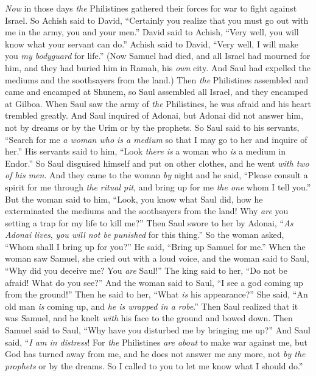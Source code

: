 \begin{biblechapter} %
\verse \textit{Now} in those days \textit{the} Philistines gathered their forces for war to fight against Israel. So Achish said to David, “Certainly you realize that you must go out with me in the army, you and your men.”
\verse David said to Achish, “Very well, you will know what your servant can do.” Achish said to David, “Very well, I will make you \textit{my bodyguard} for life.”
 (Now Samuel had died, and all Israel had mourned for him, and they had buried him in Ramah, his \textit{own} city. And Saul had expelled the mediums and the soothsayers from the land.)
\verse Then \textit{the} Philistines assembled and came and encamped at Shunem, so Saul assembled all Israel, and they encamped at Gilboa.
\verse When Saul saw the army of \textit{the} Philistines, he was afraid and his heart trembled greatly.
\verse And Saul inquired of Adonai, but Adonai did not answer him, not by dreams or by the Urim or by the prophets.
\verse So Saul said to his servants, “Search for me \textit{a woman who is a medium} so that I may go to her and inquire of her.” His servants said to him, “Look \textit{there is} a woman who \textit{is} a medium in Endor.”
\verse So Saul disguised himself and put on other clothes, and he went \textit{with two of his men}. And they came to the woman \textit{by} night and he said, “Please consult a spirit for me through \textit{the ritual pit}, and bring up for me \textit{the one} whom I tell you.”
\verse But the woman said to him, “Look, you know what Saul did, how he exterminated the mediums and the soothsayers from the land! Why \textit{are} you setting a trap for my life to kill me?”
\verse Then Saul swore to her by Adonai, “\textit{As Adonai lives}, \textit{you will not be punished} for this thing.”
\verse So the woman asked, “Whom shall I bring up for you?” He said, “Bring up Samuel for me.”
\verse When the woman saw Samuel, she cried out with a loud voice, and the woman said to Saul, “Why did you deceive me? You \textit{are} Saul!”
\verse The king said to her, “Do not be afraid! What do you see?” And the woman said to Saul, “I see a god coming up from the ground!”
\verse Then he said to her, “What \textit{is} his appearance?” She said, “An old man \textit{is} coming up, and \textit{he is wrapped in a robe}.” Then Saul realized that it was Samuel, and he knelt \textit{with} his face to the ground and bowed down.
\verse Then Samuel said to Saul, “Why have you disturbed me by bringing me up?” And Saul said, “\textit{I am in distress}! For \textit{the} Philistines \textit{are about} to make war against me, but God has turned away from me, and he does not answer me any more, not \textit{by the prophets} or by the dreams. So I called to you to let me know what I should do.”

\end{biblechapter}
